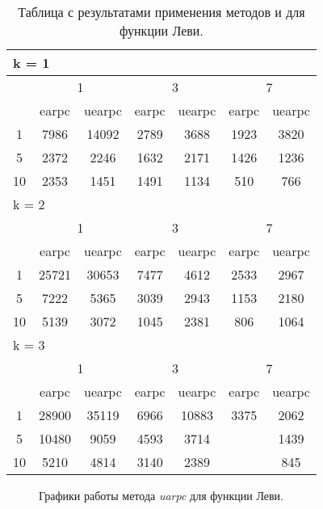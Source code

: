 \begin{table}
  \centering
  \begin{tabular}{|*7{c|}}
    \hline
    \multicolumn{7}{|l|}{k = 1} \\
    \hline
    \multirow{2}{*}{\diagbox{$\mu$}{$\lambda$}} & \multicolumn{2}{c|}{1} & \multicolumn{2}{c|}{3} & \multicolumn{2}{c|}{7} \\
    \cline{2-7}
    & earpc & uearpc & earpc & uearpc & earpc & uearpc \\
    \hline
    1 & 7986 & 14092 & 2789 & 3688 & 1923 & 3820 \\
    \hline
    5 & 2372 & 2246 & 1632 & 2171 & 1426 & 1236 \\
    \hline
    10 & 2353 & 1451 & 1491 & 1134 & 510 & 766 \\
    \hline
    \multicolumn{7}{|l|}{k = 2} \\
    \hline
    \multirow{2}{*}{\diagbox{$\mu$}{$\lambda$}} & \multicolumn{2}{c|}{1} & \multicolumn{2}{c|}{3} & \multicolumn{2}{c|}{7} \\
    \cline{2-7}
    & earpc & uearpc & earpc & uearpc & earpc & uearpc \\
    \hline
    1 & 25721 & 30653 & 7477 & 4612 & 2533 & 2967 \\
    \hline
    5 & 7222 & 5365 & 3039 & 2943 & 1153 & 2180 \\
    \hline
    10 & 5139 & 3072 & 1045 & 2381 & 806 & 1064 \\
    \hline
    \multicolumn{7}{|l|}{k = 3} \\
    \hline
    \multirow{2}{*}{\diagbox{$\mu$}{$\lambda$}} & \multicolumn{2}{c|}{1} & \multicolumn{2}{c|}{3} & \multicolumn{2}{c|}{7} \\
    \cline{2-7}
    & earpc & uearpc & earpc & uearpc & earpc & uearpc \\
    \hline
    1 & 28900 & 35119 & 6966 & 10883 & 3375 & 2062 \\
    \hline
    5 & 10480 & 9059 & 4593 & 3714 & \cellcolor{olive}{594} & 1439 \\
    \hline
    10 & 5210 & 4814 & 3140 & 2389 & \cellcolor{olive}{521} & 845 \\
    \hline
  \end{tabular}
  \captionsetup{justification=centering}
  \caption{Таблица с результатами применения методов  и  для функции Леви.}
  \label{earpc_levi_results}
\end{table}

\begin{figure}
  \centering
  \caption{ Графики работы метода \textit{uarpc} для функции Леви.}
  \label{earpc_levi_plot}
\end{figure}

